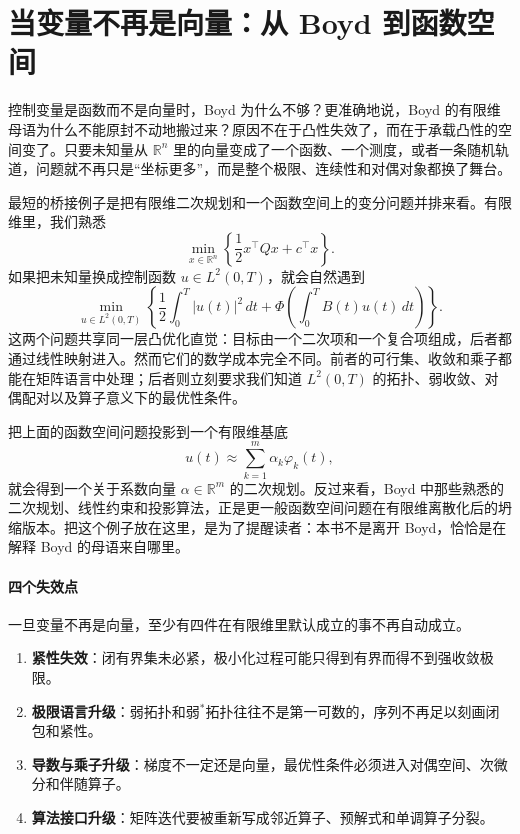 \section{当变量不再是向量：从 Boyd 到函数空间}

\label{sec:0-1}

控制变量是函数而不是向量时，Boyd 为什么不够？更准确地说，Boyd 的有限维母语为什么不能原封不动地搬过来？原因不在于凸性失效了，而在于承载凸性的空间变了。只要未知量从 $\mathbb R^n$ 里的向量变成了一个函数、一个测度，或者一条随机轨道，问题就不再只是“坐标更多”，而是整个极限、连续性和对偶对象都换了舞台。

最短的桥接例子是把有限维二次规划和一个函数空间上的变分问题并排来看。有限维里，我们熟悉
\[
\min_{x\in\mathbb R^n}\left\{\frac12 x^\top Qx+c^\top x\right\}.
\]
如果把未知量换成控制函数 $u\in L^2(0,T)$，就会自然遇到
\[
\min_{u\in L^2(0,T)}
\left\{
\frac12\int_0^T |u(t)|^2\,dt+\Phi\!\left(\int_0^T B(t)u(t)\,dt\right)
\right\}.
\]
这两个问题共享同一层凸优化直觉：目标由一个二次项和一个复合项组成，后者都通过线性映射进入。然而它们的数学成本完全不同。前者的可行集、收敛和乘子都能在矩阵语言中处理；后者则立刻要求我们知道 $L^2(0,T)$ 的拓扑、弱收敛、对偶配对以及算子意义下的最优性条件。

\begin{example}[有限维与无穷维的最短桥]
把上面的函数空间问题投影到一个有限维基底
\[
u(t)\approx \sum_{k=1}^m \alpha_k \varphi_k(t),
\]
就会得到一个关于系数向量 $\alpha\in\mathbb R^m$ 的二次规划。反过来看，Boyd 中那些熟悉的二次规划、线性约束和投影算法，正是更一般函数空间问题在有限维离散化后的坍缩版本。把这个例子放在这里，是为了提醒读者：本书不是离开 Boyd，恰恰是在解释 Boyd 的母语来自哪里。
\end{example}

\paragraph{四个失效点}

一旦变量不再是向量，至少有四件在有限维里默认成立的事不再自动成立。

\begin{enumerate}
  \item \textbf{紧性失效}：闭有界集未必紧，极小化过程可能只得到有界而得不到强收敛极限。
  \item \textbf{极限语言升级}：弱拓扑和弱$^\ast$拓扑往往不是第一可数的，序列不再足以刻画闭包和紧性。
  \item \textbf{导数与乘子升级}：梯度不一定还是向量，最优性条件必须进入对偶空间、次微分和伴随算子。
  \item \textbf{算法接口升级}：矩阵迭代要被重新写成邻近算子、预解式和单调算子分裂。
\end{enumerate}

